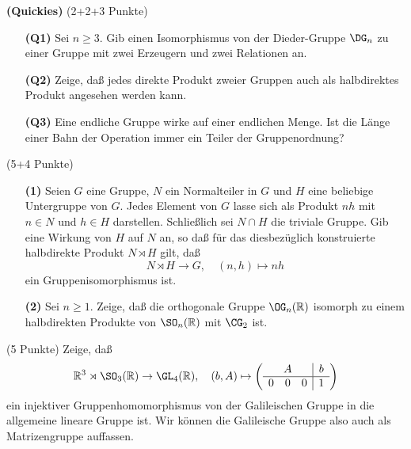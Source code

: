 \documentclass{algsheet}
\author{Dipl.-Math.~Franz Vogler}
\date{16.~Mai 2011}
\begin{document}
                \maketitle


\begin{exercise}\textbf{(Quickies)} (2+2+3 Punkte)\vspace{-1ex}
\begin{itemize}
 \item [\textbf{(Q1)}]   Sei \(n \ge 3\).
    Gib einen Isomorphismus von der Dieder-Gruppe \(\DG_n\) zu einer Gruppe mit
    zwei Erzeugern und zwei Relationen an.
\item [\textbf{(Q2)}]     Zeige, daß jedes direkte Produkt zweier Gruppen auch als halbdirektes
    Produkt angesehen werden kann.
\item [\textbf{(Q3)}]  Eine endliche Gruppe wirke auf einer endlichen Menge. Ist die Länge einer
    Bahn der Operation immer ein Teiler der Gruppenordnung?
\end{itemize}
\end{exercise}



\begin{exercise}(5+4 Punkte)\vspace{-1ex}
\begin{itemize}
 \item [\textbf{(1)}]  Seien \(G\) eine Gruppe, \(N\) ein Normalteiler in \(G\) und \(H\) eine
    beliebige Untergruppe von \(G\). Jedes Element von \(G\) lasse sich als
    Produkt \(n h\) mit \(n \in N\) und \(h \in H\) darstellen. Schließlich
    sei \(N \cap H\) die triviale Gruppe. Gib eine Wirkung von \(H\) auf
    \(N\) an, so daß für das diesbezüglich konstruierte halbdirekte Produkt
    \(N \rtimes H\) gilt, daß
    \begin{equation}
        N \rtimes H \to G,\quad (n, h) \mapsto n h
    \end{equation}
    ein Gruppenisomorphismus ist.
\item [\textbf{(2)}]     Sei \(n \ge 1\). Zeige, daß die orthogonale Gruppe \(\OG_n(\mathbb R)\) isomorph
    zu einem halbdirekten Produkte von \(\SO_n(\mathbb R)\) mit \(\CG_2\) ist.
\end{itemize}    
\end{exercise}


\begin{exercise}(5 Punkte)\newline
    Zeige, daß
    \begin{equation}
        \mathbb R^3 \rtimes \SO_3(\mathbb R) \to \GL_4(\mathbb R),\quad
        (b, A) \mapsto \left(\begin{array}{ccc|c}
            \multicolumn{3}{c|}{A} & b \\
            \hline
            0 & 0 & 0 & 1
        \end{array}\right)
    \end{equation}
    ein injektiver Gruppenhomomorphismus von der Galileischen Gruppe in die allgemeine lineare Gruppe ist.
    Wir können die Galileische Gruppe also auch als Matrizengruppe auffassen.
\end{exercise}
\end{document}

